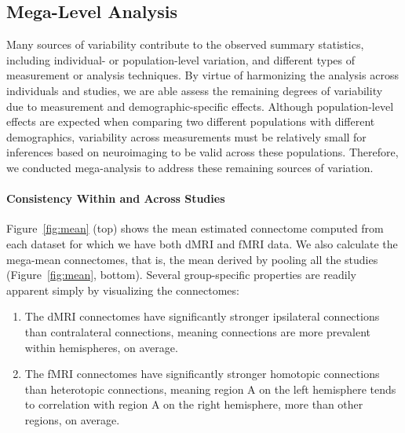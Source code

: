 \documentclass[11pt]{article}
\begin{document}
\begin{multicols}{2}
%
%
%

\subsection{Mega-Level Analysis}

Many sources of variability contribute to the observed summary statistics, including individual- or population-level variation,  and different types of measurement or analysis techniques. By virtue of harmonizing the analysis across individuals and studies, we are able assess the remaining degrees of variability due to measurement and demographic-specific effects. Although population-level effects are expected when comparing two different populations with different demographics, variability across measurements must be relatively small for inferences based on neuroimaging to be valid across these populations. Therefore, we conducted mega-analysis to address these remaining sources of variation.  


\paragraph{Consistency Within and Across Studies}




Figure~\ref{fig:mean} (top) shows the mean estimated connectome computed from each dataset for which we have both dMRI and fMRI data.  We also calculate the  mega-mean connectomes, that is, the mean derived by pooling all the studies (Figure~\ref{fig:mean}, bottom).  Several group-specific properties are readily apparent simply by visualizing the connectomes:
\begin{enumerate}[wide, labelwidth=!, labelindent=0pt, label=\bf{\arabic*)}]
        \item The dMRI connectomes have significantly stronger ipsilateral connections than contralateral connections, meaning connections are more prevalent within hemispheres, on average.
        \item The fMRI connectomes have significantly stronger homotopic connections than heterotopic connections, meaning region A on the left hemisphere tends to correlation with region A on the right hemisphere, more than other regions, on average. 
\end{enumerate}


\end{multicols}
\end{document}
